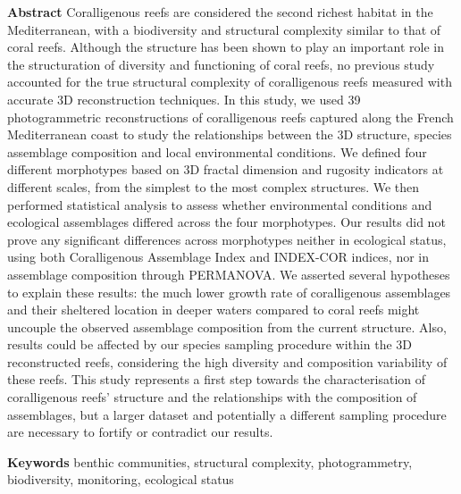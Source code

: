 \noindent\textbf{Abstract}
Coralligenous reefs are considered the second richest habitat in the Mediterranean, with a biodiversity and structural complexity similar to that of coral reefs. Although the structure has been shown to play an important role in the structuration of diversity and functioning of coral reefs, no previous study accounted for the true structural complexity of coralligenous reefs measured with accurate 3D reconstruction techniques. In this study, we used 39 photogrammetric reconstructions of coralligenous reefs captured along the French Mediterranean coast to study the relationships between the 3D structure, species assemblage composition and local environmental conditions. We defined four different morphotypes based on 3D fractal dimension and rugosity indicators at different scales, from the simplest to the most complex structures. We then performed statistical analysis to assess whether environmental conditions and ecological assemblages differed across the four morphotypes. Our results did not prove any significant differences across morphotypes neither in ecological status, using both Coralligenous Assemblage Index and INDEX-COR indices, nor in assemblage composition through PERMANOVA. We asserted several hypotheses to explain these results: the much lower growth rate of coralligenous assemblages and their sheltered location in deeper waters compared to coral reefs might uncouple the observed assemblage composition from the current structure. Also, results could be affected by our species sampling procedure within the 3D reconstructed reefs, considering the high diversity and composition variability of these reefs. This study represents a first step towards the characterisation of coralligenous reefs’ structure and the relationships with the composition of assemblages, but a larger dataset and potentially a different sampling procedure are necessary to fortify or contradict our results.

\medskip

\noindent\textbf{Keywords}
benthic communities, structural complexity, photogrammetry, biodiversity, monitoring, ecological status

\newpage

